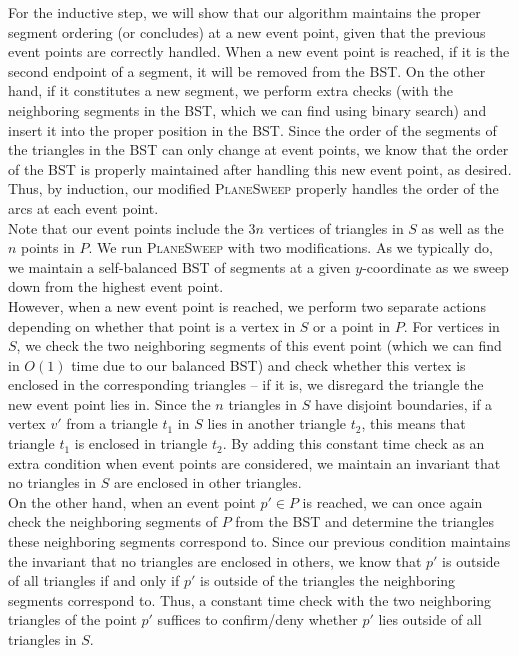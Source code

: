 \documentclass[11pt]{article}
\begin{document}
\begin{enumerate}
    For the inductive step, we will show that our algorithm maintains the proper segment ordering (or concludes) at a new event point, given that the previous event points are correctly handled. When a new event point is reached, if it is the second endpoint of a segment, it will be removed from the BST. On the other hand, if it constitutes a new segment, we perform extra checks (with the neighboring segments in the BST, which we can find using binary search) and insert it into the proper position in the BST. Since the order of the segments of the triangles in the BST can only change at event points, we know that the order of the BST is properly maintained after handling this new event point, as desired. Thus, by induction, our modified \textsc{PlaneSweep} properly handles the order of the arcs at each event point. \\
    
    Note that our event points include the $3n$ vertices of triangles in $S$ as well as the $n$ points in $P$. We run \textsc{PlaneSweep} with two modifications. As we typically do, we maintain a self-balanced BST of segments at a given $y$-coordinate as we sweep down from the highest event point.  \\

    However, when a new event point is reached, we perform two separate actions depending on whether that point is a vertex in $S$ or a point in $P$. For vertices in $S$, we check the two neighboring segments of this event point (which we can find in $O(1)$ time due to our balanced BST) and check whether this vertex is enclosed in the corresponding triangles -- if it is, we disregard the triangle the new event point lies in. Since the $n$ triangles in $S$ have disjoint boundaries, if a vertex $v'$ from a triangle $t_1$ in $S$ lies in another triangle $t_2$, this means that triangle $t_1$ is enclosed in triangle $t_2$. By adding this constant time check as an extra condition when event points are considered, we maintain an invariant that no triangles in $S$ are enclosed in other triangles. \\

    On the other hand, when an event point $p' \in P$ is reached, we can once again check the neighboring segments of $P$ from the BST and determine the triangles these neighboring segments correspond to. Since our previous condition maintains the invariant that no triangles are enclosed in others, we know that $p'$ is outside of all triangles if and only if $p'$ is outside of the triangles the neighboring segments correspond to. Thus, a constant time check with the two neighboring triangles of the point $p'$ suffices to confirm/deny whether $p'$ lies outside of all triangles in $S$. \\


\end{enumerate}
\end{document}
